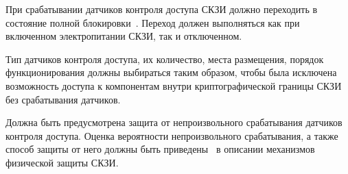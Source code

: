 \label{R.PS.Erasing} %
При срабатывании датчиков контроля доступа СКЗИ должно 
переходить в состояние полной блокировки~.
%
Переход должен выполняться как при включенном электропитании 
СКЗИ, так и отключенном.

\label{R.PS.SensorsQuality} %
Тип датчиков контроля доступа, их количество, места размещения, порядок
функционирования должны выбираться таким образом, чтобы была исключена
возможность доступа к компонентам внутри криптографической границы СКЗИ без
срабатывания датчиков.

\label{R.PS.SensorsFaults} %
Должна быть предусмотрена защита от непроизвольного срабатывания датчиков
контроля доступа. Оценка вероятности непроизвольного срабатывания, а также
способ защиты от него должны быть приведены~ в описании
механизмов физической защиты СКЗИ.

